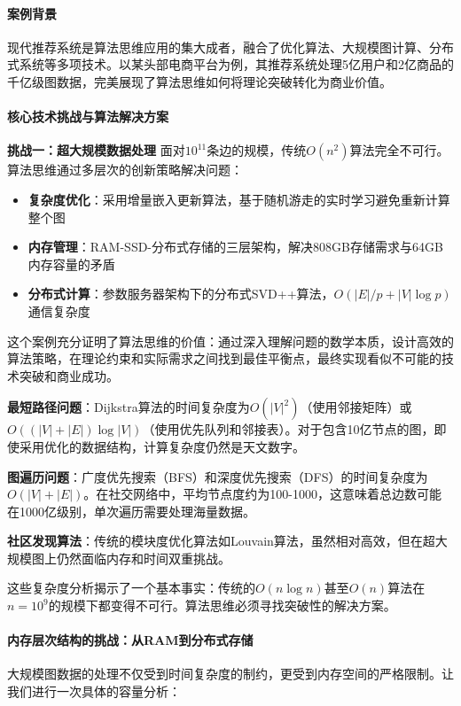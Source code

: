 \paragraph{案例背景}
现代推荐系统是算法思维应用的集大成者，融合了优化算法、大规模图计算、分布式系统等多项技术。以某头部电商平台为例，其推荐系统处理5亿用户和2亿商品的千亿级图数据，完美展现了算法思维如何将理论突破转化为商业价值。

\paragraph{核心技术挑战与算法解决方案}

\textbf{挑战一：超大规模数据处理}
面对$10^{11}$条边的规模，传统$O(n^2)$算法完全不可行。算法思维通过多层次的创新策略解决问题：

\begin{itemize}
\item \textbf{复杂度优化}：采用增量嵌入更新算法，基于随机游走的实时学习避免重新计算整个图
\item \textbf{内存管理}：RAM-SSD-分布式存储的三层架构，解决808GB存储需求与64GB内存容量的矛盾
\item \textbf{分布式计算}：参数服务器架构下的分布式SVD++算法，$O(|E|/p + |V|\log p)$通信复杂度
\end{itemize}

这个案例充分证明了算法思维的价值：通过深入理解问题的数学本质，设计高效的算法策略，在理论约束和实际需求之间找到最佳平衡点，最终实现看似不可能的技术突破和商业成功。

\textbf{最短路径问题}：Dijkstra算法的时间复杂度为$O(|V|^2)$（使用邻接矩阵）或$O((|V|+|E|)\log|V|)$（使用优先队列和邻接表）。对于包含10亿节点的图，即使采用优化的数据结构，计算复杂度仍然是天文数字。

\textbf{图遍历问题}：广度优先搜索（BFS）和深度优先搜索（DFS）的时间复杂度为$O(|V|+|E|)$。在社交网络中，平均节点度约为100-1000，这意味着总边数可能在1000亿级别，单次遍历需要处理海量数据。

\textbf{社区发现算法}：传统的模块度优化算法如Louvain算法，虽然相对高效，但在超大规模图上仍然面临内存和时间双重挑战。

这些复杂度分析揭示了一个基本事实：传统的$O(n\log n)$甚至$O(n)$算法在$n=10^9$的规模下都变得不可行。算法思维必须寻找突破性的解决方案。

\paragraph{内存层次结构的挑战：从RAM到分布式存储}
大规模图数据的处理不仅受到时间复杂度的制约，更受到内存空间的严格限制。让我们进行一次具体的容量分析：

